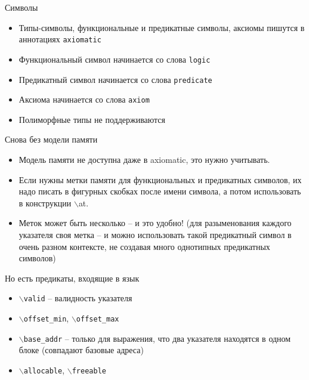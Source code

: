 \documentclass[hyperref={unicode=true}]{beamer}
\begin{document}
    \begin{frame}{Символы}
    \begin{itemize}
    \item
    Типы-символы, функциональные и предикатные символы, аксиомы
    пишутся в аннотациях \texttt{axiomatic}
    \item
    Функциональный символ начинается со слова \texttt{logic}
    \item
    Предикатный символ начинается со слова \texttt{predicate}
    \item
    Аксиома начинается со слова \texttt{axiom}
    \item
    Полиморфные типы не поддерживаются
    \end{itemize}
    \end{frame}

    \begin{frame}{Снова без модели памяти}
    \begin{itemize}
    \item
    Модель памяти не доступна даже в axiomatic, это нужно учитывать.
    \item
    Если нужны метки памяти для функциональных и предикатных символов,
    их надо писать в фигурных скобках после имени символа, а потом
    использовать в конструкции \texttt{$\backslash$}at.
    \item
    Меток может быть несколько -- и это удобно! (для разыменования
            каждого указателя своя метка -- и можно использовать
            такой предикатный символ в очень разном контексте,
            не создавая много однотипных предикатных символов)
    \end{itemize}
    \end{frame}

    \begin{frame}{Но есть предикаты, входящие в язык}
    \begin{itemize}
    \item
    \texttt{$\backslash$valid} -- валидность указателя
    \item
    \texttt{$\backslash$offset\_min}, \texttt{$\backslash$offset\_max}
    \item
    \texttt{$\backslash$base\_addr} -- только для выражения, что два
    указателя находятся в одном блоке (совпадают базовые адреса)
    \item
    \texttt{$\backslash$allocable}, \texttt{$\backslash$freeable}
    \end{itemize}
    \end{frame}
\end{document}

